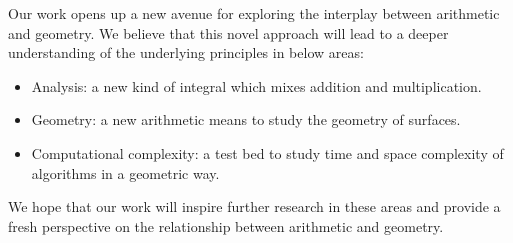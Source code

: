 \documentclass{article}
\numberwithin{definition}{section}
\numberwithin{lemma}{section}
\numberwithin{proposition}{section}
\numberwithin{corollary}{section}
\numberwithin{theorem}{section}
\begin{document}
Our work opens up a new avenue for exploring the interplay between arithmetic and geometry.
We believe that this novel approach will lead to a deeper understanding of the underlying principles in below areas:
\begin{itemize}
    \item Analysis: a new kind of integral which mixes addition and multiplication.
    \item Geometry: a new arithmetic means to study the geometry of surfaces.
    \item Computational complexity: a test bed to study time and space complexity of algorithms in a geometric way.
\end{itemize}

We hope that our work will inspire further research in these areas and provide a fresh perspective on the relationship between arithmetic and geometry.



\end{document}
